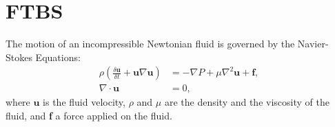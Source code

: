 
\chapter{FTBS}

The motion of an incompressible Newtonian fluid is governed by the Navier-Stokes Equations:
\begin{align}
\rho (\frac{\delta \textbf{u}}{\delta t}+\textbf{u}\nabla\textbf{u}) &=-\nabla P+\mu\nabla^2 \textbf{u} + \textbf{f}, \label{navstok} \\
\nabla \cdot \textbf{u} &= 0,\label{conteq}
\end{align}
where $\mathbf{u}$ is the fluid velocity, $\rho$ and $\mu$ are the density and the viscosity of the fluid, and \textbf{f} a force applied on the fluid.

